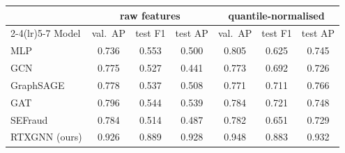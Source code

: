 \begin{tabular}{lcccccc}
\toprule
 & \multicolumn{3}{c}{raw features} & \multicolumn{3}{c}{quantile-normalised}\\
\cmidrule(lr){2-4}\cmidrule(lr){5-7}
Model & val.\ AP & test F1 & test AP & val.\ AP & test F1 & test AP\\
\midrule
MLP & 0.736 & 0.553 & 0.500 & 0.805 & 0.625 & 0.745\\
GCN & 0.775 & 0.527 & 0.441 & 0.773 & 0.692 & 0.726\\
GraphSAGE & 0.778 & 0.537 & 0.508 & 0.771 & 0.711 & 0.766\\
GAT & 0.796 & 0.544 & 0.539 & 0.784 & 0.721 & 0.748\\
SEFraud & 0.784 & 0.514 & 0.487 & 0.782 & 0.651 & 0.729\\
RTXGNN (ours) & 0.926 & 0.889 & 0.928 & 0.948 & 0.883 & 0.932\\
\bottomrule
\end{tabular}
